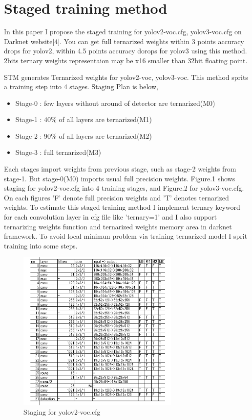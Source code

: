 \documentclass[twocolumn]{article}
\begin{document}
\section{Staged training method}
In this paper I propose the staged training for yolov2-voc.cfg, yolov3-voc.cfg on Darknet website[4].
You can get full ternarized weights within 3 points accuracy drops for yolov2, within 4.5 points accuracy dorops for yolov3 using this method.
2bits ternary weights representaion may be x16 smaller than 32bit floating point.

STM generates Ternarized weights for yolov2-voc, yolov3-voc.
This method sprits a training step into 4 stages. Staging Plan is below,

\begin{itemize}
\item Stage-0 : few layers without around of detector are ternarized(M0)
\item Stage-1 : 40\% of all layers are ternarized(M1)
\item Stage-2 : 90\% of all layers are ternarized(M2)
\item Stage-3 : full ternarized(M3)
\end{itemize}

Each stages import weights from previous stage, such as stage-2 weights from stage-1.
But stage-0(M0) imports usual full precision weights.
Figure.1 shows staging for yolov2-voc.cfg into 4 training stages, and Figure.2 for yolov3-voc.cfg.
On each figures 'F' denote full precision weights and 'T' denotes ternarized weights.
To estimate this staged training method I implement ternary keyword for each convolution layer in cfg file like 'ternary=1' and I also support ternarizing weights function and ternarized weights memory area in darknet framework.
To avoid local minimun problem via training ternarized model I sprit training into some steps.

\begin{figure}
\includegraphics[width=8cm]{yolov2-voc_Stages.png}
\caption{Staging for yolov2-voc.cfg}
\end{figure}
\end{document}
